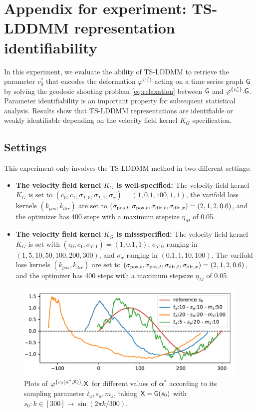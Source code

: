 \section{Appendix for experiment: TS-LDDMM representation identifiability}
In this experiment, we evaluate the ability of TS-LDDMM to retrieve the parameter $v_0^*$ that encodes the deformation $\varphi^{\{v_0^*\}}$ acting on a time series graph $\mathsf{G}$ by solving the geodesic shooting problem \eqref{eq:relaxation} between $\mathsf{G}$ and $\varphi^{\{v_0^*\}}.\mathsf{G}$. Parameter identifiability is an important property for subsequent statistical analysis. Results show that TS-LDDMM representations are identifiable or weakly identifiable depending on the velocity field kernel $K_G$ specification.

\subsection{Settings}
\label{appendix: settings_identifiability}
This experiment only involves the TS-LDDMM method in two different settings: 
\begin{itemize}
  \item \textbf{The velocity field kernel $K_G$ is well-specified:} The velocity field kernel $K_G$ is set to $ (c_0,c_1,\sigma_{T,0},\sigma_{T,1},\sigma_x) = (1,0.1,100,1,1)$, the varifold loss kernels $(k_{pos},k_{dir})$ are set to $(\sigma_{\mathrm{pos},t}, \sigma_{\mathrm{pos},t}, \sigma_{\mathrm{dir},t}, \sigma_{\mathrm{dir},x}) = (2,1,2,0.6)$, and the optimizer has 400 steps with a maximum stepsize $\eta_M$ of 0.05.
  \item \textbf{The velocity field kernel $K_G$ is missspecified:} The velocity field kernel $K_G$ is set with  $(c_0,c_1,\sigma_{T,1}) = (1,0.1,1)$, $\sigma_{T,0}$ ranging in $(1,5,10,50,100,200,300)$, and $\sigma_x$  ranging in $(0.1,1,10,100)$. The varifold loss kernels $(k_{pos},k_{dir})$ are set to $(\sigma_{\mathrm{pos},t}, \sigma_{\mathrm{pos},t}, \sigma_{\mathrm{dir},t}, \sigma_{\mathrm{dir},x}) = (2,1,2,0.6)$, and the optimizer has 400 steps with a maximum stepsize $\eta_M$ of 0.05.
\end{itemize}

\begin{figure}[t]
  \centering
  \includegraphics[width=0.5\linewidth]{pictures/samples.pdf}
  \caption{Plots of $\varphi^{\{v_0(\mathbf{\alpha}^*,\mathsf{X})\}}.\mathsf{X}$ for different values of $\mathbf{\alpha}^*$ according to its sampling parameter $t_a,s_a,m_s $, taking $\mathsf{X}=\mathsf{G}(s_0)$ with $s_0:k\in [300]\to \sin(2\pi k/300) $.}
  \label{fig:exemple_synthetic}
\end{figure}

